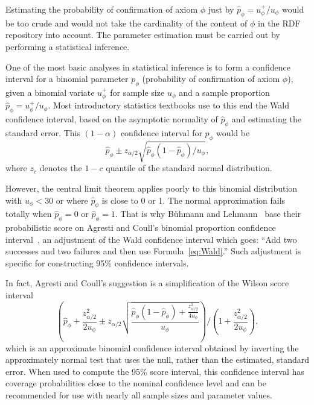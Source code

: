 \documentclass[a4paper]{article}
\newcounter{ex}
\begin{document}
Estimating the probability of confirmation of axiom $\phi$ just by $\hat{p}_\phi = u_\phi^+/u_\phi$
would be too crude and would not take the cardinality of the content of $\phi$
in the RDF repository into account.
The parameter estimation must be carried out by performing a statistical inference.

One of the most basic analyses in statistical inference is to form a confidence interval
for a binomial parameter $p_\phi$ (probability of confirmation of axiom $\phi$), given
a binomial variate $u_\phi^+$ for sample size $u_\phi$ and a sample proportion $\hat{p}_\phi = u_\phi^+/u_\phi$.
Most introductory statistics textbooks use to this end the Wald confidence interval,
based on the asymptotic normality of $\hat{p}_\phi$ and estimating the standard error.
This $(1 - \alpha)$ confidence interval for $p_\phi$ would be
\begin{equation}\label{eq:Wald}
  \hat{p}_\phi \pm z_{\alpha/2}\sqrt{\hat{p}_\phi(1 - \hat{p}_\phi)/u_\phi},
\end{equation}
where $z_c$ denotes the $1 - c$ quantile of the standard normal distribution.

However, the central limit theorem applies poorly to this binomial distribution
with $u_\phi<30$ or where $\hat{p}_\phi$ is close to 0 or 1.
The normal approximation fails totally when $\hat{p}_\phi = 0$ or $\hat{p}_\phi = 1$.
That is why B\"uhmann and Lehmann~\cite{BuehmannLehmann2012} base their probabilistic score
on Agresti and Coull's binomial proportion confidence interval~\cite{AgrestiCoull1998},
an adjustment of the Wald confidence interval which goes: ``Add two successes and two failures
and then use Formula~\ref{eq:Wald}.'' Such adjustment is specific for constructing
95\% confidence intervals.

In fact, Agresti and Coull's suggestion is a simplification of the Wilson score interval
\begin{equation}
  \left(
    \hat{p}_\phi + \frac{z_{\alpha/2}^2}{2u_\phi} \pm
    z_{\alpha/2}\sqrt{\frac{\hat{p}_\phi(1 - \hat{p}_\phi) + \frac{z_{\alpha/2}^2}{4u_\phi}}{u_\phi}}
  \right) / \left(1 + \frac{z_{\alpha/2}^2}{2u_\phi}\right),
\end{equation}
which is an approximate binomial confidence interval obtained by inverting the approximately
normal test that uses the null, rather than the estimated, standard error.
When used to compute the 95\% score interval, this confidence interval
has coverage probabilities close to the nominal confidence level and can be recommended
for use with nearly all sample sizes and parameter values.
\end{document}
